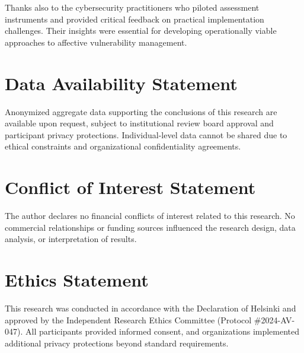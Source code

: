 \documentclass[11pt,a4paper]{article}
\begin{document}
Thanks also to the cybersecurity practitioners who piloted assessment instruments and provided critical feedback on practical implementation challenges. Their insights were essential for developing operationally viable approaches to affective vulnerability management.

\section*{Data Availability Statement}

Anonymized aggregate data supporting the conclusions of this research are available upon request, subject to institutional review board approval and participant privacy protections. Individual-level data cannot be shared due to ethical constraints and organizational confidentiality agreements.

\section*{Conflict of Interest Statement}

The author declares no financial conflicts of interest related to this research. No commercial relationships or funding sources influenced the research design, data analysis, or interpretation of results.

\section*{Ethics Statement}

This research was conducted in accordance with the Declaration of Helsinki and approved by the Independent Research Ethics Committee (Protocol \#2024-AV-047). All participants provided informed consent, and organizations implemented additional privacy protections beyond standard requirements.
\end{document}
